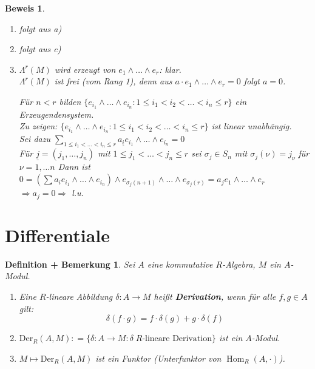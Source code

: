 \documentclass[a4paper,12pt]{scrbook}
\theoremstyle{break}
\newtheorem{DefBem}[Def]{Definition + Bemerkung}
\theoremstyle{nonumberbreak}
\newtheorem{Bew}{Beweis}
\theoremstyle{nonumberplain}
\newcommand{\emp}[1]{\textbf{\emph{#1}}}
\newcommand{\defeqr}[0]{\mathrel{\mathop:}=}
\DeclareMathOperator{\Hom}{Hom}
\begin{document}
\begin{Bew}
  \begin{enumerate}
  \item[b)] folgt aus a)
  \item[d)] folgt aus c)
  \item[c)] $\Lambda^r(M)$ wird erzeugt von $e_1 \wedge \dots \wedge e_r$: klar.\\
    $\Lambda^r(M)$ ist frei (vom Rang 1), denn aus $a \cdot e_1 \wedge \dots \wedge e_r = 0$ folgt $a=0$.

    Für $n < r$ bilden  $\{e_{i_1} \wedge \dots \wedge e_{i_n}: 1 \leq i_1 < i_2 < \dots < i_n \leq r \}$
    ein Erzeugendensystem.\\
    Zu zeigen: $\{e_{i_1} \wedge \dots \wedge e_{i_n}: 1 \leq i_1 < i_2 < \dots < i_n \leq r \}$ ist linear unabhängig.\\
    Sei dazu $\sum_{1 \leq i_1 < \dots < i_n \leq r} a_{\underline{i}}e_{i_1} \wedge \dots \wedge e_{i_n} = 0$\\
    Für $\underline{j} = (j_1, \dots, j_n)$ mit $1 \leq j_1 < \dots < j_n \leq r$ sei $\sigma_j \in S_n$ mit 
    $\sigma_j(\nu) = j_{\nu}$ für $\nu = 1, \dots n$ Dann ist $ 0= (\sum a_i e_{i_1} \wedge \dots \wedge e_{i_n}) \wedge 
    e_{\sigma_j(n+1)}  \wedge \dots \wedge e_{\sigma_j(r) } = a_j e_1 \wedge \dots \wedge e_r$ $\Rightarrow a_j = 0 \Rightarrow$ l.u. 
  \end{enumerate}
\end{Bew}
\section{Differentiale}

\begin{DefBem}
  Sei $A$ eine kommutative $R$-Algebra, $M$ ein $A$-Modul.

  \begin{enumerate}
    \item Eine $R$-lineare Abbildung $\delta: A \to M$ heißt
          \emp{Derivation}, wenn für alle $f,g \in A$ gilt:
          \[\delta(f \cdot g) = f \cdot \delta(g) + g \cdot \delta(f)\]
    \item $\mbox{Der}_R(A,M) \defeqr \{ \delta: A \to M: \delta \;
          R\text{-lineare Derivation}\}$ ist ein $A$-Modul.
    \item $M \mapsto \mbox{Der}_R(A,M)$ ist ein Funktor (Unterfunktor von $\Hom_R(A,\cdot)$).
  \end{enumerate}
\end{DefBem}
\end{document}
